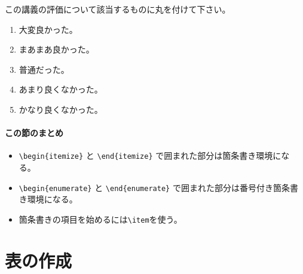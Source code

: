\vspace*{-1.5em}
\begin{kekka}
  この講義の評価について該当するものに丸を付けて下さい。
  \begin{enumerate}
  \item 大変良かった。
  \item まあまあ良かった。
  \item 普通だった。
  \item あまり良くなかった。
  \item かなり良くなかった。
  \end{enumerate}
\end{kekka}


\paragraph{この節のまとめ}

\begin{itemize}
\item \verb|\begin{itemize}| と \verb|\end{itemize}| で囲まれた部分は箇条書き環境になる。
\item \verb|\begin{enumerate}| と \verb|\end{enumerate}| で囲まれた部分は番号付き箇条書き環境になる。
\item 箇条書きの項目を始めるには\verb|\item|を使う。
\end{itemize}

\section{表の作成}
\label{sec:latex:table}

